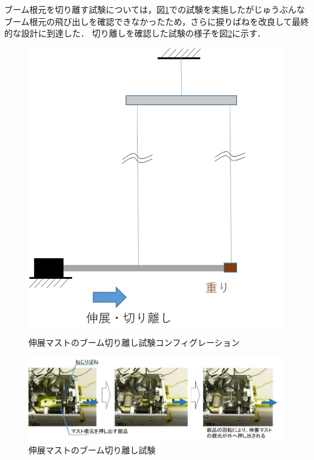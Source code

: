 ブーム根元を切り離す試験については，図\ref{fig3-9-2-1-6}での試験を実施したがじゅうぶんなブーム根元の飛び出しを確認できなかったため，さらに捩りばねを改良して最終的な設計に到達した．
切り離しを確認した試験の様子を図\ref{fig3-9-2-1-7}に示す．
\begin{figure}[H]
	\centering
	\includegraphics[width=.4\textwidth]{03/fig/3-9-2-1-6.jpg}
	\caption{伸展マストのブーム切り離し試験コンフィグレーション}
	\label{fig3-9-2-1-6}
\end{figure}
\begin{figure}[H]
	\centering
	\includegraphics[width=.8\textwidth]{03/fig/3-9-2-1-7.jpg}
	\caption{伸展マストのブーム切り離し試験}
	\label{fig3-9-2-1-7}
\end{figure}
